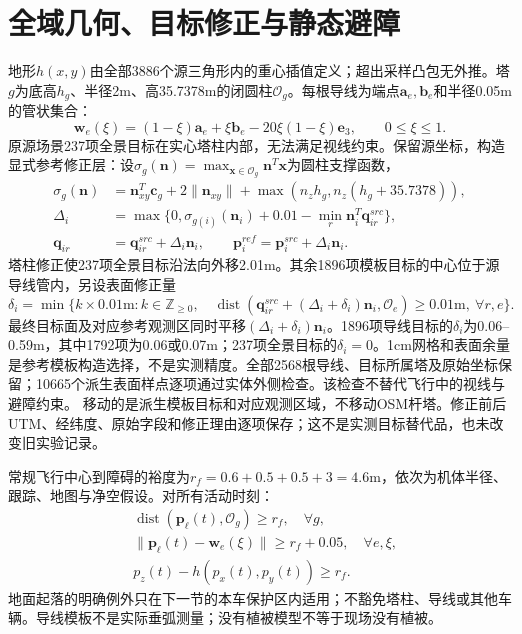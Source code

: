 \section{全域几何、目标修正与静态避障}
\noindent 地形$h(x,y)$由全部3886个源三角形内的重心插值定义；超出采样凸包无外推。塔$g$为底高$h_g$、半径2m、高35.7378m的闭圆柱$\mathcal O_g$。每根导线为端点$\mathbf a_e,\mathbf b_e$和半径0.05m的管状集合：
\begin{equation}
 \mathbf w_e(\xi)=(1-\xi)\mathbf a_e+\xi\mathbf b_e
                  -20\xi(1-\xi)\mathbf e_3,\qquad 0\le\xi\le1.
 \label{eng:eq:wiregeometry}
\end{equation}
\noindent 原源场景237项全景目标在实心塔柱内部，无法满足视线约束。保留源坐标，构造显式参考修正层：设$\sigma_g(\mathbf n)=\max_{\mathbf x\in\mathcal O_g}\mathbf n^T\mathbf x$为圆柱支撑函数，
\begin{align}
 \sigma_g(\mathbf n)&=\mathbf n_{xy}^T\mathbf c_g+2\|\mathbf n_{xy}\|
                +\max(n_z h_g,n_z(h_g+35.7378)),\\
 \Delta_i&=\max\{0,\sigma_{g(i)}(\mathbf n_i)+0.01
                         -\min_r\mathbf n_i^T\mathbf q_{ir}^{src}\},\\
 \mathbf q_{ir}&=\mathbf q_{ir}^{src}+\Delta_i\mathbf n_i,\qquad
 \mathbf p_i^{ref}=\mathbf p_i^{src}+\Delta_i\mathbf n_i.
 \label{eng:eq:targetrepair}
\end{align}
\noindent 塔柱修正使237项全景目标沿法向外移2.01m。其余1896项模板目标的中心位于源导线管内，另设表面修正量
\begin{equation}
 \delta_i=\min\{k\times0.01\mathrm{m}:k\in\mathbb Z_{\ge0},\quad
 \operatorname{dist}(\mathbf q_{ir}^{src}+(\Delta_i+\delta_i)\mathbf n_i,\mathcal O_e)
 \ge0.01\mathrm{m},\ \forall r,e\}.
 \label{eng:eq:wiresurfacerepair}
\end{equation}
\noindent 最终目标面及对应参考观测区同时平移$(\Delta_i+\delta_i)\mathbf n_i$。1896项导线目标的$\delta_i$为0.06--0.59m，其中1792项为0.06或0.07m；237项全景目标的$\delta_i=0$。1cm网格和表面余量是参考模板构造选择，不是实测精度。全部2568根导线、目标所属塔及原始坐标保留；10665个派生表面样点逐项通过实体外侧检查。该检查不替代飞行中的视线与避障约束。
\noindent 移动的是派生模板目标和对应观测区域，不移动OSM杆塔。修正前后UTM、经纬度、原始字段和修正理由逐项保存；这不是实测目标替代品，也未改变旧实验记录。

\noindent 常规飞行中心到障碍的裕度为$r_f=0.6+0.5+0.5+3=4.6$m，依次为机体半径、跟踪、地图与净空假设。对所有活动时刻：
\begin{align}
 &\operatorname{dist}(\mathbf p_\ell(t),\mathcal O_g)\ge r_f,\quad\forall g,\\
 &\|\mathbf p_\ell(t)-\mathbf w_e(\xi)\|\ge r_f+0.05,\quad\forall e,\xi,\\
 &p_z(t)-h(p_x(t),p_y(t))\ge r_f.
 \label{eng:eq:staticcollision}
\end{align}
\noindent 地面起落的明确例外只在下一节的本车保护区内适用；不豁免塔柱、导线或其他车辆。导线模板不是实际垂弧测量；没有植被模型不等于现场没有植被。
\clearpage

